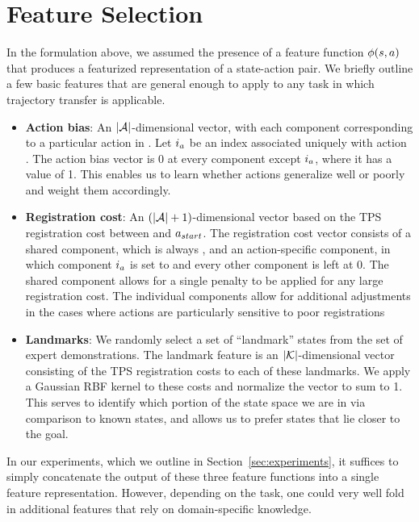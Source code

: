 \section{Feature Selection}
\label{sec:features}



In the formulation above, we assumed the presence of a feature function
$\phi(s, a)$ that produces a featurized representation of
a state-action pair.  We briefly outline a few basic features that are general
enough to apply to any task in which trajectory transfer is
applicable. 

\begin{itemize}
  \item \textbf{Action bias}: An $|\mathcal{A}{}|$-dimensional vector, with each
    component corresponding to a particular action in \actionset{}. Let
    $i{}_{a{}}$ be an index associated uniquely with action
    \actionvar{}. The action bias vector is 0 at every component except
    $i{}_{a{}}$, where it has a value of 1. This enables us to
    learn whether actions generalize well or poorly and weight them accordingly.
  \item \textbf{Registration cost}: An $(|\mathcal{A}{}|+1)$-dimensional vector
    based on the TPS registration cost \regcost{} between \statevar{} and
    $a{}_{start}$. The registration cost vector consists of a shared
    component, which is always \regcost{}, and an action-specific component, in
    which component $i{}_{a{}}$ is set to \regcost{} and every
    other component is left at 0. The shared component allows for a single
    penalty to be applied for any large registration cost. The individual
    components allow for additional adjustments in the cases where actions are
    particularly sensitive to poor registrations
  \item \textbf{Landmarks}: We randomly select a set of ``landmark'' states
    \landmarkset{} from the set of expert demonstrations. The landmark feature
    is an $|\mathcal{K}{}|$-dimensional vector consisting of the TPS
    registration costs to each of these landmarks. We apply a Gaussian RBF
    kernel to these costs and normalize the vector to sum to 1. This serves to
    identify which portion of the state space we are in via comparison to known
    states, and allows us to prefer states that lie closer to the goal.
\end{itemize}

In our experiments, which we outline in Section~\ref{sec:experiments}, it
suffices to simply concatenate the output of these three feature functions into
a single feature representation. However, depending on the task, one could
very well fold in additional features that rely on domain-specific knowledge.
